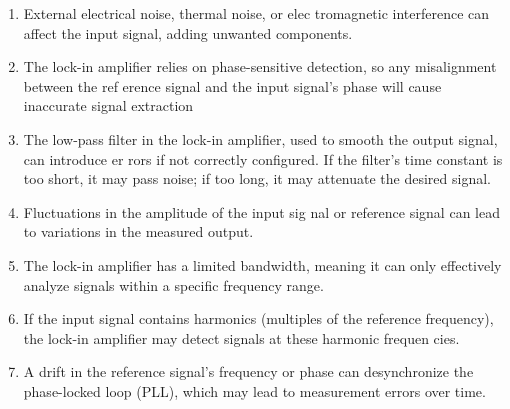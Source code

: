     \begin{enumerate}
        \item External electrical noise, thermal noise, or elec        tromagnetic interference can affect the input
        signal, adding unwanted components.
        \item The lock-in amplifier relies on phase-sensitive
        detection, so any misalignment between the ref        erence signal and the input signal’s phase will
        cause inaccurate signal extraction
        \item The low-pass filter in the lock-in amplifier, used
        to smooth the output signal, can introduce er        rors if not correctly configured.
        If the filter’s time constant is too short, it may pass noise; if
        too long, it may attenuate the desired signal.
        \item Fluctuations in the amplitude of the input sig        nal or reference signal can lead to variations in
        the measured output.
        \item The lock-in amplifier has a limited bandwidth,
        meaning it can only effectively analyze signals
        within a specific frequency range.
        \item If the input signal contains harmonics (multiples
        of the reference frequency), the lock-in amplifier
        may detect signals at these harmonic frequen        cies.
        \item A drift in the reference signal’s frequency or
        phase can desynchronize the phase-locked loop
        (PLL), which may lead to measurement errors
        over time.
    \end{enumerate}
